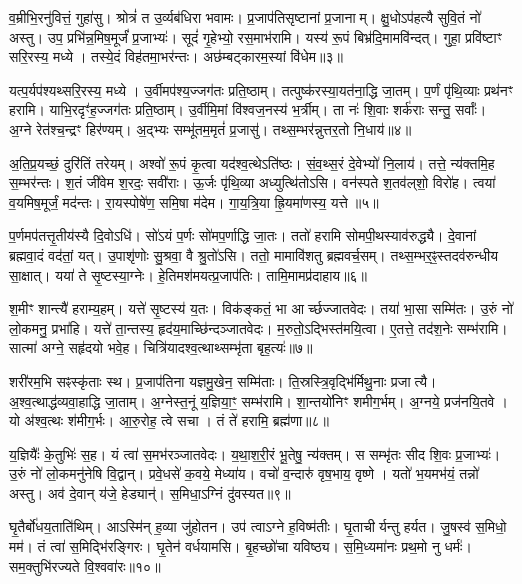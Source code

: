 व॒म्रीभि॒रनु॑वित्तं॒ गुहा॑सु।
श्रोत्रं॑ त उ॒र्व्यब॑धिरा भवामः।
प्र॒जाप॑तिसृष्टानां प्र॒जानाम्।
क्षु॒धो\-ऽप॑हत्यै सुवि॒तं नो॑ अस्तु।
उप॒ प्रभि॑न्न॒मिष॒मूर्जं॑ प्र॒जाभ्यः॑।
सूदं॑ गृ॒हेभ्यो॒ रस॒माभ॑रामि।
यस्य॑ रू॒पं बिभ्र॑दि॒मामवि॑न्दत्।
गुहा॒ प्रवि॑ष्टाꣳ सरि॒रस्य॒ मध्ये।
तस्ये॒दं विह॑तमा॒भर॑न्तः।
अछ॑म्बट्कारम॒स्यां वि॑धेम॥३॥

यत्प॒र्यप॑श्यथ्सरि॒रस्य॒ मध्ये।
उ॒र्वीमप॑श्य॒ज्जग॑तः प्रति॒ष्ठाम्।
तत्पुष्क॑रस्या॒यत॑ना॒द्धि जा॒तम्।
प॒र्णं पृ॑थि॒व्याः प्रथ॑नꣳ हरामि।
याभि॒रदृꣳ॑ह॒ज्जग॑तः प्रति॒ष्ठाम्।
उ॒र्वीमि॒मां वि॑श्वज॒नस्य॑ भ॒र्त्रीम्।
ता नः॑ शि॒वाः शर्क॑राः सन्तु॒ सर्वाः᳚।
अ॒ग्ने रेत॑श्च॒न्द्रꣳ हिर॑ण्यम्।
अ॒द्भ्यः सम्भू॑तम॒मृतं॑ प्र॒जासु॑।
तथ्स॒म्भर॑न्नुत्तर॒तो नि॒धाय॑॥४॥

अ॒ति॒प्र॒यच्छं॒ दुरि॑तिं तरेयम्।
अश्वो॑ रू॒पं कृ॒त्वा यद॑श्व॒त्थे\-ऽति॑ष्ठः।
सं॒व॒थ्स॒रं दे॒वेभ्यो॑ नि॒लाय॑।
तत्ते॒ न्य॑क्तमि॒ह स॒म्भर॑न्तः।
श॒तं जी॑वेम श॒रदः॒ सवी॑राः।
ऊ॒र्जः पृ॑थि॒व्या अध्युत्थि॑तोऽसि।
वन॑स्पते श॒तव॑ल्‌शो॒ विरो॑ह।
त्वया॑ व॒यमिष॒मूर्जं॒ मद॑न्तः।
रा॒यस्पोषे॑ण॒ समि॒षा म॑देम।
गा॒य॒त्रि॒या ह्रि॒यमा॑णस्य॒ यत्ते॥५॥

प॒र्णमप॑तत्तृ॒तीय॑स्यै दि॒वोऽधि॑।
सो॑ऽयं प॒र्णः सो॑मप॒र्णाद्धि जा॒तः।
ततो॑ हरामि सोमपी॒थस्याव॑रुद्ध्यै।
दे॒वानां ब्रह्मवा॒दं वद॑तां॒ यत्।
उ॒पाशृ॑णोः सु॒श्रवा॒ वै श्रु॒तो॑ऽसि।
ततो॒ मामावि॑शतु ब्रह्मवर्च॒सम्।
तथ्स॒म्भर॒ꣴ॒स्तदव॑रुन्धीय सा॒क्षात्।
यया॑ ते सृ॒ष्टस्या॒ग्नेः।
हे॒तिमश॑मयत्प्र॒जाप॑तिः।
तामि॒मामप्र॑दाहाय॥६॥

श॒मीꣳ शान्त्यै॑ हराम्य॒हम्।
यत्ते॑ सृ॒ष्टस्य॑ य॒तः।
विक॑ङ्कतं॒ भा आर्च्छज्जातवेदः।
तया॑ भा॒सा सम्मि॑तः।
उ॒रुं नो॑ लो॒कमनु॒ प्रभा॑हि।
यत्ते॑ ता॒न्तस्य॒ हृद॑य॒माच्छि॑न्दञ्जातवेदः।
म॒रुतो॒\-ऽद्भिस्त॑मयि॒त्वा।
ए॒तत्ते॒ तद॑श॒नेः सम्भ॑रामि।
सात्मा॑ अग्ने॒ सहृ॑दयो भवे॒ह।
चित्रि॑यादश्व॒त्थाथ्सम्भृ॑ता बृह॒त्यः॑॥७॥

शरी॑रम॒भि सꣴस्कृ॑ताः स्थ।
प्र॒जाप॑तिना यज्ञमु॒खेन॒ सम्मि॑ताः।
ति॒स्रस्त्रि॒वृद्भि॑र्मिथु॒नाः प्रजात्यै।
अ॒श्व॒त्थाद्ध॑व्य\-वा॒हाद्धि जा॒ताम्।
अ॒ग्नेस्त॒नूं य॒ज्ञिया॒ꣳ॒ सम्भ॑रामि।
शा॒न्तयो॑निꣳ शमीग॒र्भम्।
अ॒ग्नये॒ प्रज॑नयि॒तवे।
यो अ॑श्व॒त्थः श॑मीग॒र्भः।
आ॒रु॒रोह॒ त्वे सचा।
तं ते॑ हरामि॒ ब्रह्म॑णा॥८॥

य॒ज्ञियैः᳚ के॒तुभिः॑ स॒ह।
यं त्वा॑ स॒मभ॑रञ्जातवेदः।
य॒था॒श॒री॒रं भू॒तेषु॒ न्य॑क्तम्।
स सम्भृ॑तः सीद शि॒वः प्र॒जाभ्यः॑।
उ॒रुं नो॑ लो॒कमनु॑नेषि वि॒द्वान्।
प्रवे॒धसे॑ क॒वये॒ मेध्या॑य।
वचो॑ व॒न्दारु॑ वृष॒भाय॒ वृष्णे।
यतो॑ भ॒यमभ॑यं॒ तन्नो॑ अस्तु।
अव॑ दे॒वान् य॑जे॒ हेड्यान्॑।
स॒मिधा॒\-ऽग्निं दु॑वस्यत॥९॥

घृ॒तैर्बो॑धय॒ताति॑थिम्।
आऽस्मि॑न् ह॒व्या जु॑होतन।
उप॑ त्वा\-ऽग्ने ह॒विष्म॑तीः।
घृ॒ताचीर्यन्तु हर्यत।
जु॒षस्व॑ स॒मिधो॒ मम॑।
तं त्वा॑ स॒मिद्भि॑रङ्गिरः।
घृ॒तेन॑ वर्धयामसि।
बृ॒हच्छो॑चा यविष्ठ्य।
स॒मि॒ध्यमा॑नः प्रथ॒मो नु धर्मः॑।
सम॒क्तुभि॑रज्यते वि॒श्ववा॑रः॥१०॥

